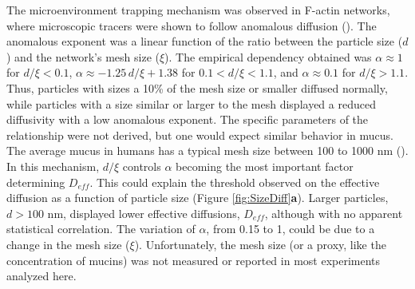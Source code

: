 \documentclass[aps,prl,preprint,superscriptaddress,showkeys,linenumbers]{revtex4-1}
\begin{document}
The microenvironment trapping mechanism was observed in F-actin networks, where microscopic tracers were shown to follow anomalous diffusion (\cite{Wong_2004}). The anomalous exponent was a linear function of the ratio between the particle size ($d$) and the network's mesh size ($\xi$). The empirical dependency obtained was $\alpha \approx 1$ for $d/\xi < 0.1$, $\alpha \approx -1.25\, d/\xi + 1.38$ for $0.1< d/\xi < 1.1$, and $\alpha \approx 0.1$ for $d/\xi > 1.1$. Thus, particles with sizes a 10\% of the mesh size or smaller diffused normally, while particles with a size similar or larger to the mesh displayed a reduced diffusivity with a low anomalous exponent. The specific parameters of the relationship were not derived, but one would expect similar behavior in mucus.
The average mucus in humans has a typical mesh size between 100 to 1000 nm  (\cite{ConeAdvDDM2009}). 
In this mechanism, $d/\xi$ controls $\alpha$ becoming the most important factor determining $D_{eff}$.
This could explain the threshold observed on the effective diffusion as a function of particle size (Figure \ref{fig:SizeDiff}\textbf{a}).
Larger particles, $d>100$ nm, displayed lower effective diffusions, $D_{eff}$, although with no apparent statistical correlation. The variation of $\alpha$, from 0.15 to 1, could be due to a change in the mesh size ($\xi$). 
Unfortunately, the mesh size (or a proxy, like the concentration of mucins) was not measured or reported in most experiments analyzed here.
\end{document}
